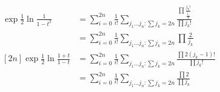 



\begin{align*}
    [2n]\exp\frac{1}{2}\ln \frac{1}{1 - t^2}
     & = \sum_{i = 0}^{2n} \frac{1}{i!} \sum_{j_1 \dots j_n : \sum j_k = 2n} \frac{\prod \frac{j_k!}{\frac{j_k}{2}}}{\prod j_k!} \\
     & = \sum_{i = 0}^{2n} \frac{1}{i!} \sum_{j_1 \dots j_n : \sum j_k = 2n} \prod \frac{2}{j_k}                                 \\
    [2n]\exp \frac{1}{2} \ln \frac{1 + t}{1 - t}
     & = \sum_{i = 0}^{2n} \frac{1}{i!} \sum_{j_1 \dots j_n : \sum j_k = 2n} \frac{\prod 2(j_k - 1)!}{\prod j_k!}                \\
     & = \sum_{i = 0}^{2n} \frac{1}{i!} \sum_{j_1 \dots j_n : \sum j_k = 2n} \frac{\prod 2}{\prod j_k}                           \\
\end{align*}


